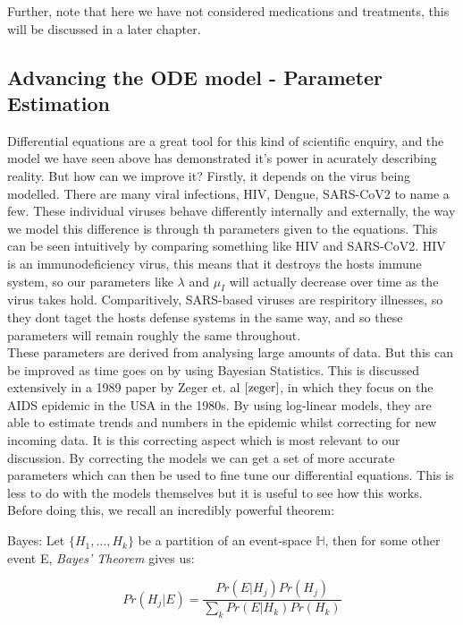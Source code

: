 Further, note that here we have not considered medications and treatments, this will be discussed in a later chapter.

\subsection{Advancing the ODE model - Parameter Estimation}

Differential equations are a great tool for this kind of scientific enquiry, and the model we have seen above has demonstrated it's power in acurately describing reality. But how can we improve it? Firstly, it depends on the virus being modelled. There are many viral infections, HIV, Dengue, SARS-CoV2 to name a few. These individual viruses behave differently internally and externally, the way we model this difference is through th parameters given to the equations. This can be seen intuitively by comparing something like HIV and SARS-CoV2. HIV is an immunodeficiency virus, this means that it destroys the hosts immune system, so our parameters like $\lambda$ and  $\mu_I$ will actually decrease over time as the virus takes hold. Comparitively, SARS-based viruses are respiritory illnesses, so they dont taget the hosts defense systems in the same way, and so these parameters will remain roughly the same throughout. \\

These parameters are derived from analysing large amounts of data. But this can be improved as time goes on by using Bayesian Statistics. This is discussed extensively in a 1989 paper by Zeger et. al $\cite{zeger}$, in which they focus on the AIDS epidemic in the USA in the 1980s. By using log-linear models, they are able to estimate trends and numbers in the epidemic whilst correcting for new incoming data. It is this correcting aspect which is most relevant to our discussion. By correcting the models we can get a set of more accurate parameters which can then be used to fine tune our differential equations. This is less to do with the models themselves but it is useful to see how this works. Before doing this, we recall an incredibly powerful theorem:

\begin{theorem}{Bayes:}
Let $\{H_1,\ldots,H_k\}$ be a partition of an event-space $\mathbb{H}$, then for some other event E, \textit{Bayes' Theorem} gives us:

\begin{equation}        
    Pr(H_j | E) = \frac{Pr(E|H_j)Pr(H_j)}{\sum_k Pr(E|H_k)Pr(H_k)}
\end{equation}

\end{theorem}

